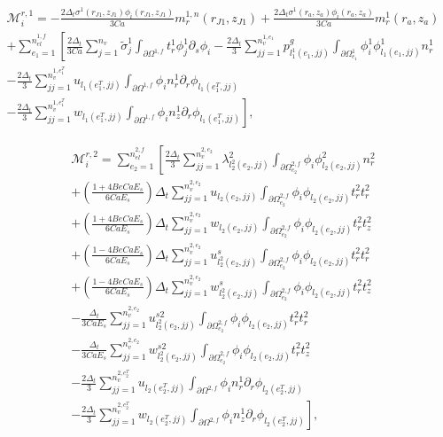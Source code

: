 \documentclass{article}
\begin{document}
\begin{equation}
\begin{array}{l} \mathcal{M}_i^{r,1} = -\frac{2\Delta_t \sigma^1(r_{J1},z_{J1})\phi_i(r_{J1},z_{J1})}{3Ca} m_r^{1,n}(r_{J1},z_{J1}) + \frac{2\Delta_t \sigma^1(r_a,z_a)\phi_i(r_a,z_a)}{3Ca} m_r^{1}(r_a,z_a) \\ + \sum_{e_1=1}^{n_{el}^{1,f}} \left[ \frac{2\Delta_t}{3Ca} \sum_{j=1}^{n_v} \tilde{\sigma}_j^1 \int_{\partial \Omega^{1,f}} t_r^1 \phi_j^1 \partial_s \phi_i - \frac{2\Delta_t}{3} \sum_{jj=1}^{n_v^{1,e_1}} p_{l_1^1(e_1,jj)}^g \int_{\partial \Omega_{e_1}^{1}} \phi_i^1 \phi_{l_1(e_1,jj)}^1 n_r^1 \right. \\ - \frac{2\Delta_t}{3} \sum_{jj=1}^{n_v^{1,e_1^T}} u_{l_1(e_1^T,jj)} \int_{\partial \Omega^{1,f}} \phi_i n_r^1 \partial_r \phi_{l_1(e_1^T,jj)} \\ \left. - \frac{2\Delta_t}{3} \sum_{jj=1}^{n_v^{1,e_1^T}} w_{l_1(e_1^T,jj)} \int_{\partial \Omega^{1,f}} \phi_i n_z^1 \partial_r \phi_{l_1(e_1^T,jj)} \right], \end{array} \tag{4.126}
\end{equation}

\begin{equation}
\begin{array}{l} \mathcal{M}_i^{r,2} = \sum_{e_2=1}^{n_{el}^{2,f}} \left[ \frac{2\Delta_t}{3} \sum_{jj=1}^{n_v^{2,e_2}} \lambda_{l_2^2(e_2,jj)}^2 \int_{\partial \Omega_{e_2}^{2,f}} \phi_i \phi_{l_2(e_2,jj)}^2 n_r^2 \right. \\ + \left( \frac{1 + 4Be Ca E_s}{6Ca E_s} \right) \Delta_t \sum_{jj=1}^{n_v^{2,e_2}} u_{l_2(e_2,jj)} \int_{\partial \Omega_{e_2}^{2,f}} \phi_i \phi_{l_2(e_2,jj)} t_r^2 t_r^2 \\ + \left( \frac{1 + 4Be Ca E_s}{6Ca E_s} \right) \Delta_t \sum_{jj=1}^{n_v^{2,e_2}} w_{l_2(e_2,jj)} \int_{\partial \Omega_{e_2}^{2,f}} \phi_i \phi_{l_2(e_2,jj)} t_r^2 t_z^2 \\ + \left( \frac{1 - 4Be Ca E_s}{6Ca E_s} \right) \Delta_t \sum_{jj=1}^{n_v^{2,e_2}} u_{l_2^2(e_2,jj)}^s \int_{\partial \Omega_{e_2}^{2,f}} \phi_i \phi_{l_2(e_2,jj)} t_r^2 t_r^2 \\ + \left( \frac{1 - 4Be Ca E_s}{6Ca E_s} \right) \Delta_t \sum_{jj=1}^{n_v^{2,e_2}} w_{l_2^2(e_2,jj)}^s \int_{\partial \Omega_{e_2}^{2,f}} \phi_i \phi_{l_2(e_2,jj)} t_r^2 t_z^2 \\ - \frac{\Delta_t}{3Ca E_s} \sum_{jj=1}^{n_v^{2,e_2}} u_{l_2^2(e_2,jj)}^{s2} \int_{\partial \Omega_{e_2}^{2,f}} \phi_i \phi_{l_2(e_2,jj)} t_r^2 t_r^2 \\ - \frac{\Delta_t}{3Ca E_s} \sum_{jj=1}^{n_v^{2,e_2}} w_{l_2^2(e_2,jj)}^{s2} \int_{\partial \Omega_{e_2}^{2,f}} \phi_i \phi_{l_2(e_2,jj)} t_r^2 t_z^2 \\ - \frac{2\Delta_t}{3} \sum_{jj=1}^{n_v^{2,e_2^T}} u_{l_2(e_2^T,jj)} \int_{\partial \Omega^{2,f}} \phi_i n_r^1 \partial_r \phi_{l_2(e_2^T,jj)} \\ \left. - \frac{2\Delta_t}{3} \sum_{jj=1}^{n_v^{2,e_2^T}} w_{l_2(e_2^T,jj)} \int_{\partial \Omega^{2,f}} \phi_i n_z^1 \partial_r \phi_{l_2(e_2^T,jj)} \right], \end{array} \tag{4.127}
\end{equation}
\end{document}

